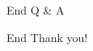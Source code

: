 \begin{frame}{End}
    \centering
    \Huge {Q \& A}
\end{frame}

\begin{frame}{End}
    \centering
    \Huge {Thank you!}
\end{frame}